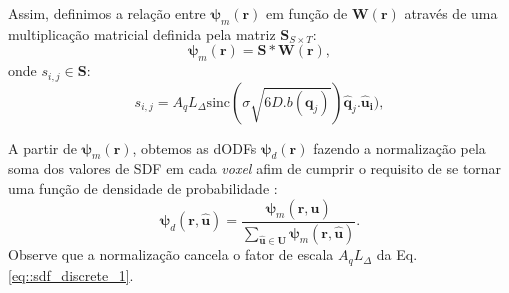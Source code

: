 \documentclass[
    12pt,                %
    oneside,            %
    a4paper,            %
    english,            %
    french,                %
    spanish,            %
    brazil                %
    ]{abntex2}
\begin{document}
Assim, definimos a relação entre $\boldsymbol{\psi}_m(\mathbf{r})$ em função de $\mathbf{W}(\mathbf{r})$ através de uma multiplicação matricial definida pela matriz $\mathbf{S}_{S\times T}$:
\begin{equation}
\label{eq::gqi_vec}
    \boldsymbol{\psi}_m(\mathbf{r}) = \mathbf{S}*\mathbf{W}(\mathbf{r}) ,
\end{equation}
onde $s_{i,j} \in \mathbf{S}$:
\begin{equation}
\label{eq::s_ij}
s_{i,j} = A_qL_{\Delta}\text{sinc}(\sigma \sqrt{6D.b(\mathbf{q}_j)} )\mathbf{\hat{q}}_j.\mathbf{\hat{u}_i}) ,
\end{equation}

A partir de $\boldsymbol{\psi}_m(\mathbf{r})$, obtemos as dODFs $\boldsymbol{\psi}_d(\mathbf{r})$ fazendo a normalização pela soma dos valores de SDF em cada \textit{voxel} afim de cumprir o requisito de se tornar uma função de densidade de probabilidade \cite{yeh2010}:
\begin{equation}
\label{eq::SDF2dODF_prob}
    \boldsymbol{\psi}_d(\mathbf{r}, \mathbf{\hat{u}}) =
    \frac{\boldsymbol{\psi}_m(\mathbf{r}, \mathbf{\hat{u}})}{\sum \limits_{\mathbf{\hat{u}} \in \mathbf{U}}\boldsymbol{\psi}_m(\mathbf{r}, \mathbf{\hat{u}})}.
\end{equation}
Observe que a normalização cancela o fator de escala $A_qL_{\Delta}$ da Eq. \ref{eq::sdf_discrete_1}.

%





\end{document}
